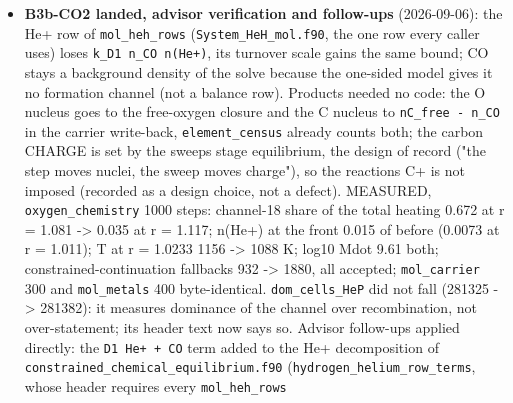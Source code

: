 \documentclass[english,a4paper]{my_memo}
\begin{document}
\begin{itemize}
  \texttt{log10\ Mdot} stays 9.61 with exit 0. \texttt{dom\_cells\_HeP} does NOT fall
  (281325 -\textgreater{} 281382): the counter compares \texttt{k\_D1\ n\_CO} with recombination and
  still says this reaction is the leading He+ loss of the layer, so what it
  now reports is the operator split\textquotesingle s lag rather than a missing sink.
  \texttt{mol\_carrier} 300 steps and \texttt{mol\_metals} 400 steps byte-identical in every
  output file. Goldens not refreshed. Reported for owners elsewhere: the
  \texttt{dom\_cells\_HeP} header text in \texttt{write\_output.f90} 558-562 still says the
  frozen He+ "over-states that channel"; the mirror decomposition
  \texttt{hydrogen\_helium\_row\_terms} in \texttt{constrained\_chemical\_equilibrium.f90}
  needs the same term after line 1859 or it stops summing to row 2; the \texttt{n\_co}
  comment in \texttt{ion\_cell\_state.f90} still calls CO an equilibrium closure.
\item
  \textbf{B3b-CO2 landed, advisor verification and follow-ups} (2026-09-06): the
  He+ row of \texttt{mol\_heh\_rows} (\texttt{System\_HeH\_mol.f90}, the one row every caller
  uses) loses \texttt{k\_D1\ n\_CO\ n(He+)}, its turnover scale gains the same bound;
  CO stays a background density of the solve because the one-sided model
  gives it no formation channel (not a balance row). Products needed no
  code: the O nucleus goes to the free-oxygen closure and the C nucleus to
  \texttt{nC\_free\ -\ n\_CO} in the carrier write-back, \texttt{element\_census} already counts
  both; the carbon CHARGE is set by the sweep\textquotesingle s stage equilibrium, the
  design of record ("the step moves nuclei, the sweep moves charge"), so the
  reaction\textquotesingle s C+ is not imposed (recorded as a design choice, not a defect).
  MEASURED, \texttt{oxygen\_chemistry} 1000 steps: channel-18 share of the total
  heating 0.672 at r = 1.081 -\textgreater{} 0.035 at r = 1.117; n(He+) at the front
  0.015 of before (0.0073 at r = 1.011); T at r = 1.0233 1156 -\textgreater{} 1088 K;
  log10 Mdot 9.61 both; constrained-continuation fallbacks 932 -\textgreater{} 1880, all
  accepted; \texttt{mol\_carrier} 300 and \texttt{mol\_metals} 400 byte-identical.
  \texttt{dom\_cells\_HeP} did not fall (281325 -\textgreater{} 281382): it measures dominance of
  the channel over recombination, not over-statement; its header text now
  says so. Advisor follow-ups applied directly: the \texttt{D1\ He+\ +\ CO} term added
  to the He+ decomposition of \texttt{constrained\_chemical\_equilibrium.f90}
  (\texttt{hydrogen\_helium\_row\_terms}, whose header requires every \texttt{mol\_heh\_rows}

\end{itemize}
\end{document}
